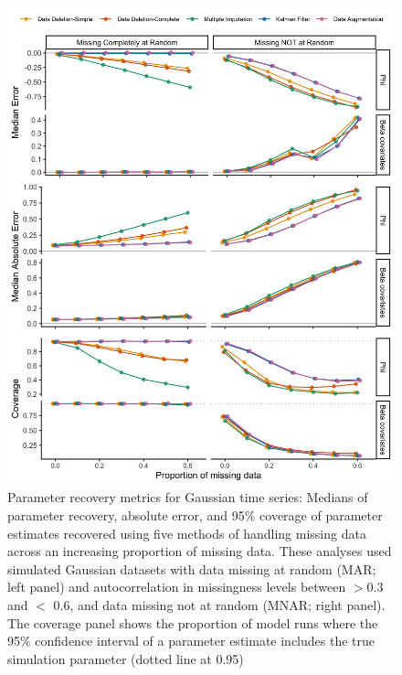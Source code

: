 \documentclass{article}
\begin{document}
\begin{figure}
    \noindent\includegraphics[width = \textwidth]{Figures/MockedUpFigures/parameterRecoveryGaussian_MARMNARlong.png}
    \caption{Parameter recovery metrics for Gaussian time series: Medians of parameter recovery, absolute error, and 95\% coverage of parameter estimates recovered using five methods of handling missing data across an increasing proportion of missing data. These analyses used simulated Gaussian datasets with data missing at random (MAR; left panel) and autocorrelation in missingness levels between $>$0.3 and $<$ 0.6, and data missing not at random (MNAR; right panel). The coverage panel shows the proportion of model runs where the 95\% confidence interval of a parameter estimate includes the true simulation parameter (dotted line at 0.95)}
    \label{fig:ParamRec_Gauss}
\end{figure}
\end{document}
